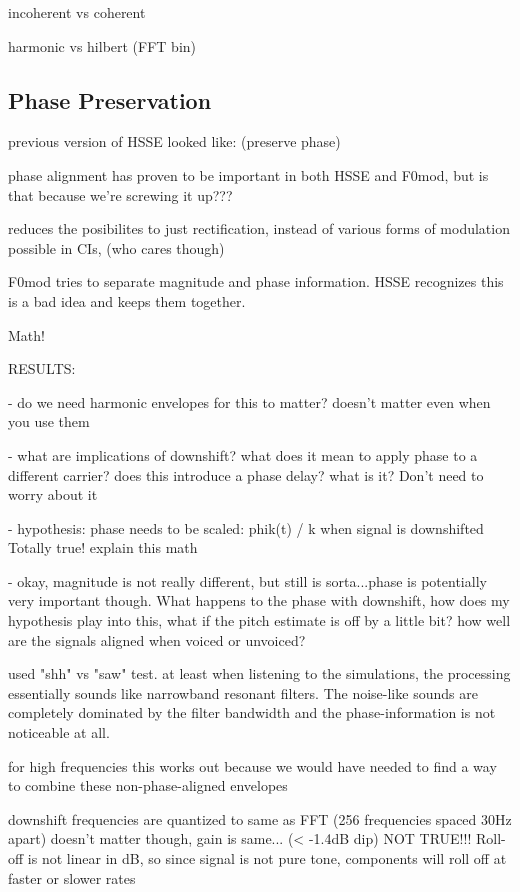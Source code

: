 \documentclass [11pt, proquest] {uwthesis}[2015/03/03]
\begin{document}
incoherent vs coherent

harmonic vs hilbert (FFT bin)


\subsection{Phase Preservation}

previous version of HSSE looked like: (preserve phase)

phase alignment has proven to be important in both HSSE and F0mod, but is that because we're screwing it up???

reduces the posibilites to just rectification, instead of various forms of modulation possible in CIs, (who cares though)

F0mod tries to separate magnitude and phase information.  HSSE recognizes this is a bad idea and keeps them together.

Math!

RESULTS:

 - do we need harmonic envelopes for this to matter?
 doesn't matter even when you use them

 - what are implications of downshift? what does it mean to apply phase to a different carrier? does this introduce a phase delay? what is it?
 Don't need to worry about it
 
 - hypothesis: phase needs to be scaled: phik(t) / k when signal is downshifted
 Totally true! explain this math
 
 - okay, magnitude is not really different, but still is sorta...phase is potentially very important though.  What happens to the phase with downshift, how does my hypothesis play into this, what if the pitch estimate is off by a little bit?  how well are the signals aligned when voiced or unvoiced?
 
used "shh" vs "saw" test.  at least when listening to the simulations, the processing essentially sounds like narrowband resonant filters.  The noise-like sounds are completely dominated by the filter bandwidth and the phase-information is not noticeable at all.

for high frequencies this works out because we would have needed to find a way to combine these non-phase-aligned envelopes

downshift frequencies are quantized to same as FFT (256 frequencies spaced 30Hz apart)
doesn't matter though, gain is same... (< -1.4dB dip)
NOT TRUE!!! Roll-off is not linear in dB, so since signal is not pure tone, components will roll off at faster or slower rates
\end{document}
